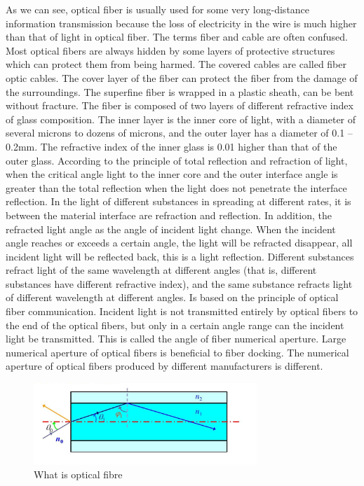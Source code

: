 \documentclass[a4paper]{article}
\begin{document}
As we can see, optical fiber is usually used for some very long-distance information transmission because the loss of electricity in the wire is much higher than that of light in optical fiber. The terms fiber and cable are often confused. Most optical fibers are always hidden by some layers of protective structures which can protect them from being harmed. The covered cables are called fiber optic cables. The cover layer of the fiber can protect the fiber from the damage of the surroundings. The superfine fiber is wrapped in a plastic sheath, can be bent without fracture. The fiber is composed of two layers of different refractive index of glass composition. The inner layer is the inner core of light, with a diameter of several microns to dozens of microns, and the outer layer has a diameter of 0.1 -- 0.2mm. The refractive index of the inner glass is 0.01 higher than that of the outer glass. According to the principle of total reflection and refraction of light, when the critical angle light to the inner core and the outer interface angle is greater than the total reflection when the light does not penetrate the interface reflection. In the light of different substances in spreading at different rates, it is between the material interface are refraction and reflection. In addition, the refracted light angle as the angle of incident light change. When the incident angle reaches or exceeds a certain angle, the light will be refracted disappear, all incident light will be reflected back, this is a light reflection. Different substances refract light of the same wavelength at different angles (that is, different substances have different refractive index), and the same substance refracts light of different wavelength at different angles. Is based on the principle of optical fiber communication. Incident light is not transmitted entirely by optical fibers to the end of the optical fibers, but only in a certain angle range can the incident light be transmitted. This is called the angle of fiber numerical aperture. Large numerical aperture of optical fibers is beneficial to fiber docking. The numerical aperture of optical fibers produced by different manufacturers is different.\cite{Optical Fibre}
\\
\begin{figure}[h]
	\includegraphics[width=0.75\textwidth]{7.png}
		\caption{What is optical fibre}
\end{figure}
\end{document}

